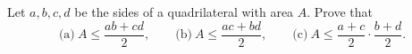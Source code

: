 Let $a, b, c, d$ be the sides of a quadrilateral with area $A$. Prove that
\[ \text{(a)}\ A \leq \frac{ab + cd}{2},\qquad \text{(b)}\ A \leq \frac{ac + bd}{2},\qquad \text{(c)}\ A \leq \frac{a + c}{2} \cdot \frac{b + d}{2}. \]
